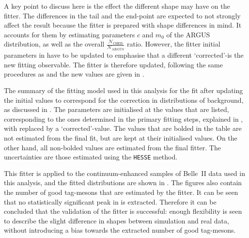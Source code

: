A key point to discuss here is the effect the different \Mbc shape may have on the \Mbc fitter.
The differences in the tail and the end-point are expected to not strongly affect the result because the \Mbc fitter is prepared with shape differences in mind.
It accounts for them by estimating parameters $c$ and $m_0$ of the ARGUS distribution, as well as the overall $\frac{\mathcal{N}_{\mathrm{CHEB}}}{\mathcal{N}_{\mathrm{ARGUS}}}$ ratio.
However, the \Mbc fitter initial parameters in  have to be updated to emphasise that a different `corrected'-\Mbc is the new fitting observable.
The \Mbc fitter is therefore updated, following the same procedures as  and the new values are given in .
\begin{table}[htbp!]
    \centering
    \caption{\label{tab:fitting_init_params_updated} The summary of the fitting model used in this analysis for the \Mbc fit after updating the initial values to correspond for the correction in \Mbc distributions of background, as discussed in .
    The parameters are initialised at the values that are listed, corresponding to the ones determined in the primary fitting steps, explained in , with \Mbc replaced by a `corrected'-\Mbc value.
    The values that are bolded in the table are not estimated from the final \Mbc fit, but are kept at their initialised values.
    On the other hand, all non-bolded values are estimated from the final fitter.
    The uncertainties are those estimated using the \texttt{HESSE} method.
    }
    
\end{table}

This fitter is applied to the continuum-enhanced samples of Belle~II data used in this analysis,
and the  fitted \Mbc distributions are shown in .
The figures also contain the number of good tag-\B mesons that are estimated by the fitter.
It can be seen that no statistically significant peak in \Mbc is extracted.
Therefore it can be concluded that the validation of the \Mbc fitter is successful: enough flexibility is seen
to describe the slight difference in \Mbc shapes between simulation and real data, without introducing a bias towards the extracted number of good tag-\B mesons.


